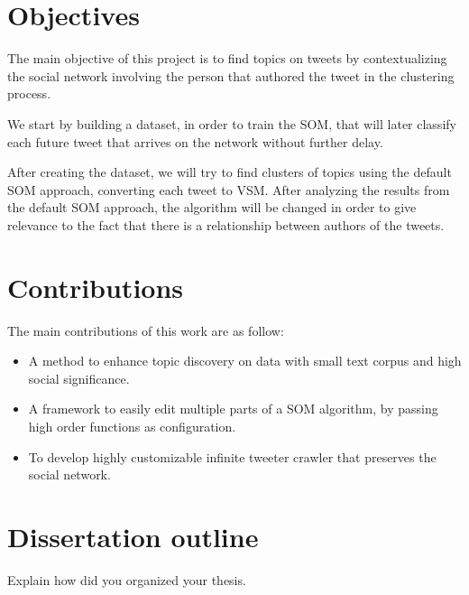 \section{Objectives}
The main objective of this project is to find topics on tweets by contextualizing the social network involving the person that authored the tweet in the clustering process.

We start by building a dataset, in order to train the \ac{SOM}, that will later classify each future tweet that arrives on the network without further delay.

After creating the dataset, we will try to find clusters of topics using the default \ac{SOM} approach, converting each tweet to \ac{VSM}. After analyzing the results from the default \ac{SOM} approach, the algorithm will be changed in order to give relevance to the fact that there is a relationship between authors of the tweets.

\section{Contributions}
The main contributions of this work are as follow:
\begin{itemize}
  \item A method to enhance topic discovery on data with small text corpus and high social significance.
  \item A framework to easily edit multiple parts of a \ac{SOM} algorithm, by passing high order functions as configuration.
  \item To develop highly customizable infinite tweeter crawler that preserves the social network.  
\end{itemize}

\section{Dissertation outline}
Explain how did you organized your thesis.

\cleardoublepage 
